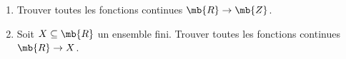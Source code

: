 \exercice

\begin{enumerate}

\item Trouver toutes les fonctions continues $\mb{R} \rightarrow \mb{Z}$.

\item Soit $X\subseteq \mb{R}$ un ensemble fini. Trouver toutes les fonctions continues $\mb{R} \rightarrow X$.

\end{enumerate}


